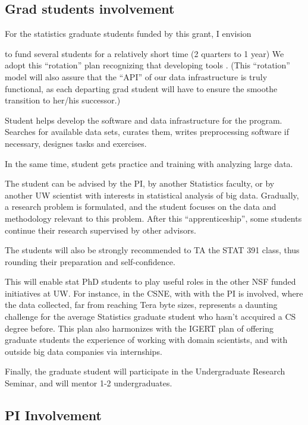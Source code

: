 \subsection{Grad students involvement}

For the statistics graduate students funded by this grant, I envision 

\bit
\item to fund several students for a relatively short time (2 quarters
  to 1 year) We adopt this ``rotation'' plan recognizing that developing tools .
(This ``rotation'' model will also assure that the ``API'' of our data infrastructure is truly functional, as each departing grad student will have to ensure the smoothe transition to her/his successor.)
\item Student helps develop the software and data infrastructure for
  the program. Searches for available data sets, curates them, writes
  preprocessing software if necessary, designes tasks and exercises.
\item In the same time, student gets practice and training with
  analyzing large data. 
\item The student can be advised by the PI, by another Statistics faculty, or by another UW scientist with interests in statistical analysis of big data. Gradually, a research problem is formulated, and the student focuses on the data and methodology relevant to this problem. After this ``apprenticeship'', some students continue their research supervised by other advisors. 
\item The students will also be strongly recommended to TA the STAT 391 class, thus rounding their preparation and self-confidence. 
\item This will enable stat PhD students to play useful roles in the other NSF funded initiatives at UW. For instance, in the CSNE, with with the PI is involved, where the data collected, far from reaching Tera byte sizes, represents a daunting challenge for the average Statistics graduate student who hasn't accquired a CS degree before. This plan also harmonizes with the IGERT plan of offering graduate students the experience of working with domain scientists, and with outside big data companies via internships. 
\item Finally, the graduate student will participate in the Undergraduate Research Seminar, and will mentor 1-2 undergraduates. 
 \eit

\subsection{PI Involvement}


